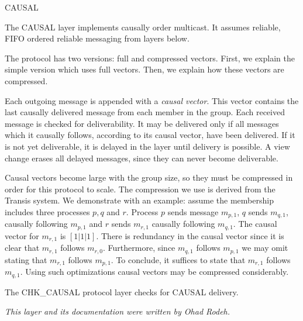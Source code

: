 %
%
%
\begin{Layer}{CAUSAL}

The CAUSAL layer implements causally order multicast.  It assumes
reliable, FIFO ordered reliable messaging from layers below.

\begin{Protocol}
The protocol has two versions: full and compressed vectors.  First,
we explain the simple version which uses full vectors. Then, we
explain how these vectors are compressed.

Each outgoing message is appended with a \emph{causal vector}. This
vector contains the last causally delivered message from each member
in the group.  Each received message is checked for deliverability.
It may be delivered only if all messages which it causally follows,
according to its causal vector, have been delivered.  If it is not
yet deliverable, it is delayed in the layer until delivery is
possible.  A view change erases all delayed messages, since they can
never become deliverable.

Causal vectors become large with the group size, so they must be
compressed in order for this protocol to scale.  The compression we
use is derived from the Transis system.  We demonstrate with an
example: assume the membership includes three processes $p,q$ and
$r$. Process $p$ sends message $m_{p,1}$, $q$ sends $m_{q,1}$,
causally following $m_{p,1}$ and $r$ sends $m_{r,1}$ causally
following $m_{q,1}$. The causal vector for $m_{r,1}$ is
$[1|1|1]$. There is redundancy in the causal vector since it is clear
that $m_{r,1}$ follows $m_{r,0}$. Furthermore, since $m_{q,1}$
follows $m_{p,1}$ we may omit stating that $m_{r,1}$ follows
$m_{p,1}$. To conclude, it suffices to state that $m_{r,1}$ follows
$m_{q,1}$.  Using such optimizations causal vectors may be compressed
considerably.
\end{Protocol}

\begin{Sources}
\end{Sources}

\begin{Testing}
\item
The CHK\_CAUSAL protocol layer checks for CAUSAL delivery.
\end{Testing}

\emph{This layer and its documentation were written by Ohad Rodeh.}
\end{Layer}
